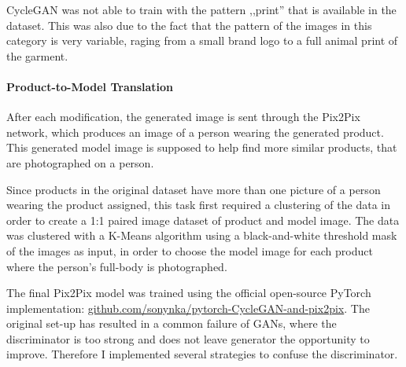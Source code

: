 \documentclass[12pt]{report}
\begin{document}
CycleGAN was not able to train with the pattern ,,print'' that is available in the dataset. This was also due to the fact that the pattern of the images in this category is very variable, raging from a small brand logo to a full animal print of the garment.

%



\paragraph{Product-to-Model Translation}
After each modification, the generated image is sent through the Pix2Pix network, which produces an image of a person wearing the generated product. This generated model image is supposed to help find more similar products, that are photographed on a person.

Since products in the original dataset have more than one picture of a person wearing the product assigned, this task first required a clustering of the data in order to create a 1:1 paired image dataset of product and model image. The data was clustered with a K-Means algorithm using a black-and-white threshold mask of the images as input, in order to choose the model image for each product where the person's full-body is photographed.

The final Pix2Pix model was trained using the official open-source PyTorch implementation: \linebreak \hyperlink{https://github.com/sonynka/pytorch-CycleGAN-and-pix2pix}{github.com/sonynka/pytorch-CycleGAN-and-pix2pix}. The original set-up has resulted in a common failure of GANs, where the discriminator is too strong and does not leave generator the opportunity to improve. Therefore I implemented several strategies to confuse the discriminator.
\end{document}

